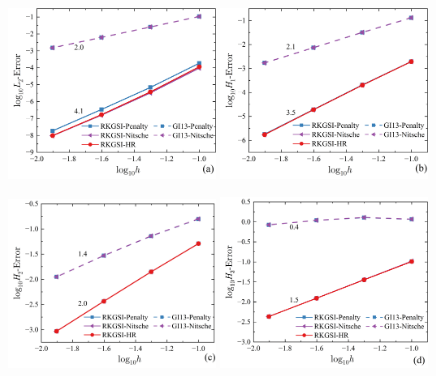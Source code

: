 \begin{figure}[H]
    \centering
    \begin{subcaptiongroup}
    \includegraphics[width=0.49\textwidth]{figure/PHR/R/CL2.png}
    \label{RCL2}
    \includegraphics[width=0.49\textwidth]{figure/PHR/R/CH1.png}
    \label{RCH1}
    \end{subcaptiongroup}
    \begin{subcaptiongroup}
    \includegraphics[width=0.49\textwidth]{figure/PHR/R/CH2.png}
    \label{RCH2}
    \includegraphics[width=0.49\textwidth]{figure/PHR/R/CH3.png}
    \label{RCH3}
    \end{subcaptiongroup}
\caption{}
\label{RCLH}
\end{figure}
